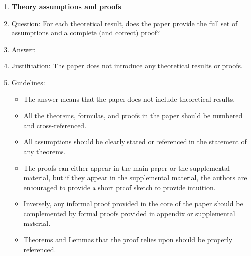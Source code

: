 \documentclass{article}
\begin{document}
\begin{enumerate}

\item {\bf Theory assumptions and proofs}
    \item[] Question: For each theoretical result, does the paper provide the full set of assumptions and a complete (and correct) proof?
    \item[] Answer: \answerNA{} %
    \item[] Justification: The paper does not introduce any theoretical results or proofs.
    \item[] Guidelines:
    \begin{itemize}
        \item The answer \answerNA{} means that the paper does not include theoretical results.
        \item All the theorems, formulas, and proofs in the paper should be numbered and cross-referenced.
        \item All assumptions should be clearly stated or referenced in the statement of any theorems.
        \item The proofs can either appear in the main paper or the supplemental material, but if they appear in the supplemental material, the authors are encouraged to provide a short proof sketch to provide intuition.
        \item Inversely, any informal proof provided in the core of the paper should be complemented by formal proofs provided in appendix or supplemental material.
        \item Theorems and Lemmas that the proof relies upon should be properly referenced.
    \end{itemize}


\end{enumerate}
\end{document}
